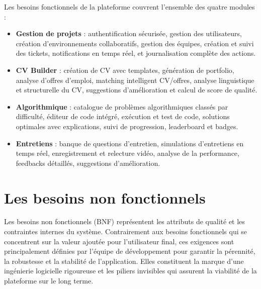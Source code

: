 \documentclass[12pt,a4paper]{report}
\begin{document}
Les besoins fonctionnels de la plateforme couvrent l'ensemble des quatre modules :

\begin{itemize}
	\item \textbf{Gestion de projets} : authentification sécurisée, gestion des utilisateurs, création d'environnements collaboratifs, gestion des équipes, création et suivi des tickets, notifications en temps réel, et journalisation complète des actions.
	
	\item \textbf{CV Builder} : création de CV avec templates, génération de portfolio, analyse d'offres d'emploi, matching intelligent CV/offres, analyse linguistique et structurelle du CV, suggestions d'amélioration et calcul de score de qualité.
	
	\item \textbf{Algorithmique} : catalogue de problèmes algorithmiques classés par difficulté, éditeur de code intégré, exécution et test de code, solutions optimales avec explications, suivi de progression, leaderboard et badges.
	
	\item \textbf{Entretiens} : banque de questions d'entretien, simulations d'entretiens en temps réel, enregistrement et relecture vidéo, analyse de la performance, feedbacks détaillés, suggestions d'amélioration.
\end{itemize}
	

\section{Les besoins non fonctionnels}

Les besoins non fonctionnels (BNF) représentent les attributs de qualité et les contraintes internes du système. Contrairement aux besoins fonctionnels qui se concentrent sur la valeur ajoutée pour l'utilisateur final, ces exigences sont principalement définies par l'équipe de développement pour garantir la pérennité, la robustesse et la stabilité de l'application. Elles constituent la marque d'une ingénierie logicielle rigoureuse et les piliers invisibles qui assurent la viabilité de la plateforme sur le long terme.
\end{document}
